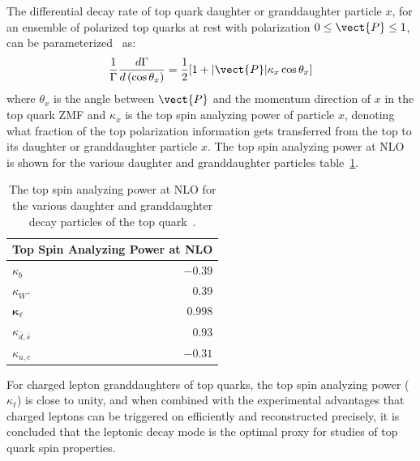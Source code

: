The differential decay rate of top quark daughter or granddaughter particle $x$, for an ensemble of polarized top quarks at rest with polarization $0 \leq \vect{P} \leq 1$, can be parameterized~\cite{BRANDENBURG2002235} as:
\begin{align}
\frac{1}{\Gamma} \frac{d \Gamma}{d\left(\cos \theta_x\right)}=\frac{1}{2}[1+ \vert \vect{P} \vert \kappa_x \cos \theta_x]
\end{align}
where $\theta_x$ is the angle between $\vect{P}$ and the momentum direction of $x$ in the top quark ZMF and $\kappa_x$ is the top spin analyzing power of particle $x$, denoting what fraction of the top polarization information gets transferred from the top to its daughter or granddaughter particle $x$.
The top spin analyzing power at NLO is shown for the various daughter and granddaughter particles table~\ref{spin_analyzing_power_NLO}.
\begin{table}[!h]
\begin{center}
\begin{tabular}{lr}
\multicolumn{2}{c}{ Top Spin Analyzing Power at NLO } \\
\hline$\kappa_b$ & $-0.39$ \\
$\kappa_{W^{+}}$ & $0.39$ \\
$\boldsymbol{\kappa}_{\ell}$ & $\mathbf{0.998}$ \\
$\kappa_{\bar{d}, \bar{s}}$ & $0.93$ \\
$\kappa_{u, c}$ & $-0.31$
\end{tabular}
\caption{The top spin analyzing power at NLO for the various daughter and granddaughter decay particles of the top quark~\cite{BRANDENBURG2002235}.
         }
\label{spin_analyzing_power_NLO}
\end{center}
\end{table}
For charged lepton granddaughters of top quarks, the top spin analyzing power ($\kappa_\ell$) is close to unity, and when combined with the experimental advantages that charged leptons can be triggered on efficiently and reconstructed precisely, it is concluded that the leptonic decay mode is the optimal proxy for studies of top quark spin properties.

